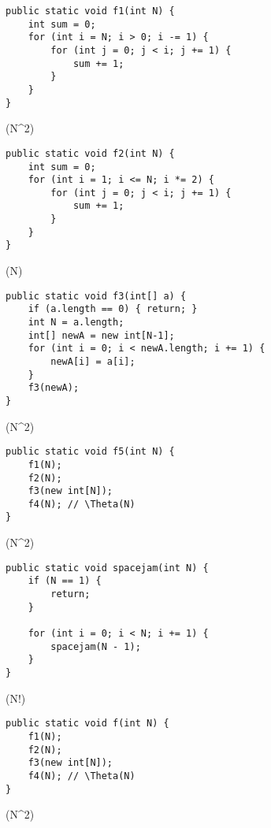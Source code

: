 \begin{lstlisting}
public static void f1(int N) {
    int sum = 0;
    for (int i = N; i > 0; i -= 1) {
        for (int j = 0; j < i; j += 1) {
            sum += 1;
        }
    }
}
\end{lstlisting}
\begin{solution}
\Theta(N^2)
\end{solution}

\begin{lstlisting}
public static void f2(int N) {
    int sum = 0;
    for (int i = 1; i <= N; i *= 2) {
        for (int j = 0; j < i; j += 1) {
            sum += 1;
        }
    }
}
\end{lstlisting}
\begin{solution}
\Theta(N)
\end{solution}


\begin{lstlisting}
public static void f3(int[] a) {
    if (a.length == 0) { return; }
    int N = a.length;
    int[] newA = new int[N-1];
    for (int i = 0; i < newA.length; i += 1) {
        newA[i] = a[i];
    }
    f3(newA);
}
\end{lstlisting}
\begin{solution}
\Theta(N^2)
\end{solution}

\begin{lstlisting}
public static void f5(int N) {
    f1(N);
    f2(N);
    f3(new int[N]);
    f4(N); // \Theta(N)
}
\end{lstlisting}
\begin{solution}
\Theta(N^2)
\end{solution}

\begin{lstlisting}
public static void spacejam(int N) {
    if (N == 1) {
        return;
    }
    
    for (int i = 0; i < N; i += 1) {
        spacejam(N - 1);
    }
}
\end{lstlisting}
\begin{solution}
\Theta(N!)
\end{solution}

\begin{lstlisting}
public static void f(int N) {
    f1(N);
    f2(N);
    f3(new int[N]);
    f4(N); // \Theta(N)
}
\end{lstlisting}
\begin{solution}
\Theta(N^2)
\end{solution}

